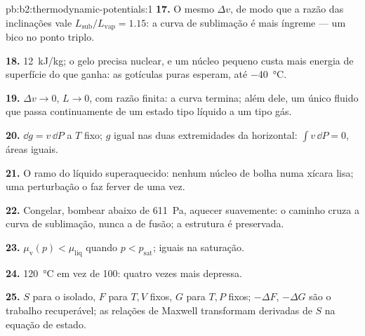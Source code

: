 \begin{solution}{pb:b2:thermodynamic-potentials:1}
\textbf{17.} O mesmo $\Delta v$, de modo que a razão das inclinações vale $L_{\text{sub}}/L_{\text{vap}}
= 1.15$: a curva de sublimação é mais íngreme --- um bico no ponto triplo.

\textbf{18.} \qty{12}{kJ/kg}; o gelo precisa nuclear, e um núcleo pequeno custa
mais energia de superfície do que ganha: as gotículas puras esperam, até
\qty{-40}{\celsius}.

\textbf{19.} $\Delta v \to 0$, $L \to 0$, com razão finita: a curva termina;
além dele, um único fluido que passa continuamente de um estado tipo líquido a um tipo gás.

\textbf{20.} $\dd g = v\,\dd P$ a $T$ fixo; $g$ igual nas duas extremidades da
horizontal: $\int v\,\dd P = 0$, áreas iguais.

\textbf{21.} O ramo do líquido superaquecido: nenhum núcleo de bolha numa
xícara lisa; uma perturbação o faz ferver de uma vez.

\textbf{22.} Congelar, bombear abaixo de \qty{611}{Pa}, aquecer suavemente: o caminho
cruza a curva de sublimação, nunca a de fusão; a estrutura
é preservada.

\textbf{23.} $\mu_{\text{v}}(p) < \mu_{\text{liq}}$ quando $p < p_{\text{sat}}$; iguais na
saturação.

\textbf{24.} \qty{120}{\celsius} em vez de \qty{100}{}: quatro vezes mais depressa.

\textbf{25.} $S$ para o isolado, $F$ para $T,V$ fixos, $G$ para $T,P$ fixos;
$-\Delta F$, $-\Delta G$ são o trabalho recuperável; as relações de Maxwell transformam
derivadas de $S$ na equação de estado.
\end{solution}
